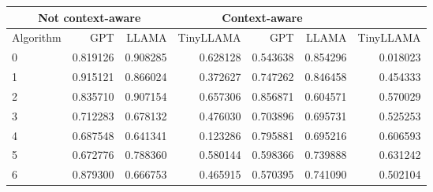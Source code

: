 \begin{tabular}{lrrrrrr}
\toprule
\multicolumn{3}{c}{Not context-aware} & \multicolumn{3}{c}{Context-aware} \\
\midrule
Algorithm & GPT & LLAMA & TinyLLAMA & GPT & LLAMA & TinyLLAMA \\
0 & 0.819126 & 0.908285 & 0.628128 & 0.543638 & 0.854296 & 0.018023 \\
1 & 0.915121 & 0.866024 & 0.372627 & 0.747262 & 0.846458 & 0.454333 \\
2 & 0.835710 & 0.907154 & 0.657306 & 0.856871 & 0.604571 & 0.570029 \\
3 & 0.712283 & 0.678132 & 0.476030 & 0.703896 & 0.695731 & 0.525253 \\
4 & 0.687548 & 0.641341 & 0.123286 & 0.795881 & 0.695216 & 0.606593 \\
5 & 0.672776 & 0.788360 & 0.580144 & 0.598366 & 0.739888 & 0.631242 \\
6 & 0.879300 & 0.666753 & 0.465915 & 0.570395 & 0.741090 & 0.502104 \\
\bottomrule
\end{tabular}
